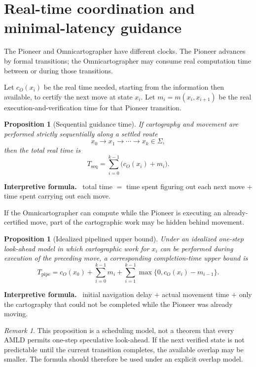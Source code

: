 \documentclass[11pt]{article}
\newtheorem{proposition}[theorem]{Proposition}
\theoremstyle{definition}
\theoremstyle{remark}
\newtheorem{remark}[theorem]{Remark}
\newcommand{\Sett}{\Sigma}
\newenvironment{interpretiveformula}{%
  \begin{center}\begin{minipage}{0.92\textwidth}\small
  \textbf{Interpretive formula.}\ }{\end{minipage}\end{center}}
\begin{document}
\section{Real-time coordination and minimal-latency guidance}
The Pioneer and Omnicartographer have different clocks. The Pioneer advances by formal transitions; the Omnicartographer may consume real computation time between or during those transitions.

Let $c_O(x_i)$ be the real time needed, starting from the information then available, to certify the next move at state $x_i$. Let $m_i=m(x_i,x_{i+1})$ be the real execution-and-verification time for that Pioneer transition.

\begin{proposition}[Sequential guidance time]
If cartography and movement are performed strictly sequentially along a settled route
\[
x_0\to x_1\to\cdots\to x_k\in\Sett,
\]
then the total real time is
\[
\boxed{
T_{\mathrm{seq}}=\sum_{i=0}^{k-1}\bigl(c_O(x_i)+m_i\bigr).
}
\]
\end{proposition}

\begin{interpretiveformula}
total time $=$ time spent figuring out each next move $+$ time spent carrying out each move.
\end{interpretiveformula}

If the Omnicartographer can compute while the Pioneer is executing an already-certified move, part of the cartographic work may be hidden behind movement.

\begin{proposition}[Idealized pipelined upper bound]
Under an idealized one-step look-ahead model in which cartographic work for $x_i$ can be performed during execution of the preceding move, a corresponding completion-time upper bound is
\[
\boxed{
T_{\mathrm{pipe}}
=
 c_O(x_0)
+\sum_{i=0}^{k-1}m_i
+\sum_{i=1}^{k-1}\max\{0,c_O(x_i)-m_{i-1}\}.
}
\]
\end{proposition}

\begin{interpretiveformula}
initial navigation delay $+$ actual movement time $+$ only the cartography that could not be completed while the Pioneer was already moving.
\end{interpretiveformula}

\begin{remark}
This proposition is a scheduling model, not a theorem that every AMLD permits one-step speculative look-ahead. If the next verified state is not predictable until the current transition completes, the available overlap may be smaller. The formula should therefore be used under an explicit overlap model.
\end{remark}
\end{document}
